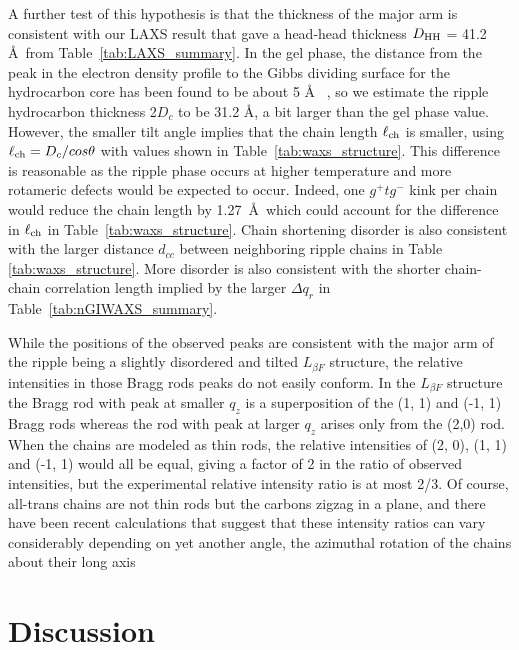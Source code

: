 A further test of this hypothesis is that the thickness of the major arm is 
consistent with our LAXS result that gave a head-head thickness 
$D_\textrm{HH}$ = 41.2 \AA\ from Table~\ref{tab:LAXS_summary}. In the gel phase, the 
distance from the peak in the electron density profile to the Gibbs dividing 
surface for the hydrocarbon core has been found to be about 5 \AA
~\cite{Tristram-Nagle02}, so we estimate the ripple hydrocarbon thickness 
2$D_c$ to be 31.2 \AA, a bit larger than the gel phase value. However, the 
smaller tilt angle implies that the chain length $\ell_\text{ch}$ is smaller, using 
$\ell_\text{ch}=D_c/cos{\theta}$ with values shown in Table~\ref{tab:waxs_structure}.  
This difference is reasonable as the ripple phase occurs at higher temperature 
and more rotameric defects would be expected to occur.  Indeed, one 
$g^+tg^-$ kink per chain would reduce the chain length by 1.27~\AA\ which could
account for the difference in $\ell_\text{ch}$ in Table~\ref{tab:waxs_structure}.  
Chain shortening disorder is also consistent with the larger distance 
$d_{cc}$ between neighboring ripple chains in Table \ref{tab:waxs_structure}.  
More disorder is also consistent with the shorter chain-chain correlation 
length implied by the larger ${\Delta}q_r$ in Table~\ref{tab:nGIWAXS_summary}.

While the positions of the observed peaks are consistent
with the major arm of the ripple being a slightly disordered and tilted 
$L_{\beta F}$ structure, 
the relative intensities in those Bragg rods peaks do not easily conform. 
In the $L_{\beta F}$ structure the Bragg rod with peak at smaller $q_z$ is a 
superposition of the (1, 1) and (-1, 1) Bragg rods whereas the rod with peak 
at larger $q_z$ arises only from the (2,0) rod.  When the chains are modeled as 
thin rods, the relative intensities 
of (2, 0), (1, 1) and (-1, 1) would all be equal, giving a factor of 2 in the 
ratio of observed intensities, but the experimental relative intensity ratio 
is at most 2/3. Of course, all-trans chains are not thin rods but the carbons 
zigzag in a plane, and there have been recent calculations that suggest that 
these intensity ratios can vary considerably depending on yet another angle, 
the azimuthal rotation of the chains about their long axis \cite{ref:Akabori14,ref:Watkins14}

\newpage
\section{Discussion}\label{sec:ripple_discussion}
